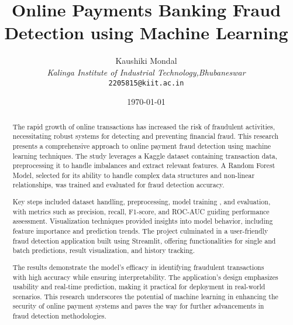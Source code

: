 \documentclass[12pt,a4paper]{article}
\title{\textbf{Online Payments Banking Fraud Detection using Machine Learning}}
\author{
    Kaushiki Mondal \\
    \textit{Kalinga Institute of Industrial Technology,Bhubaneswar } \\
    \texttt{2205815@kiit.ac.in}
}
\date{\today}
\begin{document}
\maketitle

\begin{abstract}
The rapid growth of online transactions has increased the risk of fraudulent activities, necessitating robust systems for detecting and preventing financial fraud. This research presents a comprehensive approach to online payment fraud detection using machine learning techniques. The study leverages a Kaggle dataset containing transaction data, preprocessing it to handle imbalances and extract relevant features. A Random Forest Model, selected for its ability to handle complex data structures and non-linear relationships, was trained and evaluated for fraud detection accuracy.

Key steps included dataset handling, preprocessing, model training , and evaluation, with metrics such as precision, recall, F1-score, and ROC-AUC guiding performance assessment. Visualization techniques provided insights into model behavior, including feature importance and prediction trends. The project culminated in a user-friendly fraud detection application built using Streamlit, offering functionalities for single and batch predictions, result visualization, and history tracking.

The results demonstrate the model's efficacy in identifying fraudulent transactions with high accuracy while ensuring interpretability. The application's design emphasizes usability and real-time prediction, making it practical for deployment in real-world scenarios. This research underscores the potential of machine learning in enhancing the security of online payment systems and paves the way for further advancements in fraud detection methodologies.
\end{abstract}
\end{document}
